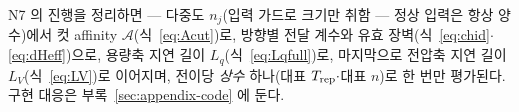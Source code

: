 N7 의 진행을 정리하면 --- 다중도 $n_j$(입력 가드로 크기만 취함 --- 정상 입력은 항상 양수)에서 컷 affinity $\mathcal A$(식~\eqref{eq:Acut})로,
방향별 전달 계수와 유효 장벽(식~\eqref{eq:chid}$\cdot$\eqref{eq:dHeff})으로, 용량축 지연 길이
$L_q$(식~\eqref{eq:Lqfull})로, 마지막으로 전압축 지연 길이 $L_V$(식~\eqref{eq:LV})로 이어지며, 전이당
\emph{상수} 하나(대표 $T_{\mathrm{rep}}\cdot$대표 $n$)로 한 번만 평가된다. 구현 대응은
부록~\ref{sec:appendix-code} 에 둔다.

